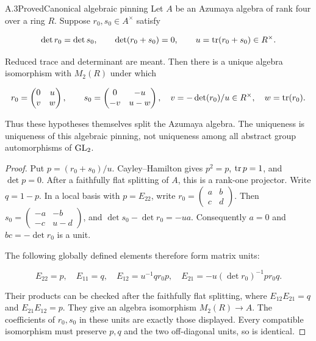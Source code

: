 \begin{statement}{A.3}{Proved}{Canonical algebraic pinning}
Let $A$ be an Azumaya algebra of rank four over a ring $R$.
Suppose $r_0,s_0\in A^\times$ satisfy

$$
\det r_0=\det s_0,\qquad
 \det(r_0+s_0)=0,\qquad
 u=\operatorname{tr}(r_0+s_0)\in R^\times .
$$

Reduced trace and determinant are meant. Then there is a unique
algebra isomorphism with $M_2(R)$ under which

$$
r_0=\begin{pmatrix}0&u\\v&w\end{pmatrix},\qquad
 s_0=\begin{pmatrix}0&-u\\-v&u-w\end{pmatrix},
 \quad v=-\det(r_0)/u\in R^\times,\quad w=\operatorname{tr}(r_0).
$$

Thus these hypotheses themselves split the Azumaya algebra.
The uniqueness is uniqueness of this algebraic pinning,
not uniqueness among all abstract group automorphisms of $\operatorname{GL}_2$.
\end{statement}
\begin{proof}
Put $p=(r_0+s_0)/u$. Cayley--Hamilton gives $p^2=p$,
$\operatorname{tr} p=1$, and $\det p=0$. After a faithfully flat splitting
of $A$, this is a rank-one projector. Write $q=1-p$.
In a local basis with $p=E_{22}$, write
$r_0=\left(\begin{smallmatrix}a&b\\c&d\end{smallmatrix}\right)$.
Then
$s_0=\left(\begin{smallmatrix}-a&-b\\-c&u-d\end{smallmatrix}\right)$,
and
$\det s_0-\det r_0=-ua$.
Consequently $a=0$ and $bc=-\det r_0$ is a unit.

The following globally defined elements therefore form matrix units:

$$
E_{22}=p,\quad E_{11}=q,\quad
 E_{12}=u^{-1}q r_0p,\quad
 E_{21}=-u(\det r_0)^{-1}p r_0q.
$$

Their products can be checked after the faithfully flat splitting,
where $E_{12}E_{21}=q$ and $E_{21}E_{12}=p$.
They give an algebra isomorphism $M_2(R)\to A$.
The coefficients of $r_0,s_0$ in these units are exactly those
displayed. Every compatible isomorphism must preserve $p,q$
and the two off-diagonal units, so is identical.
\end{proof}

